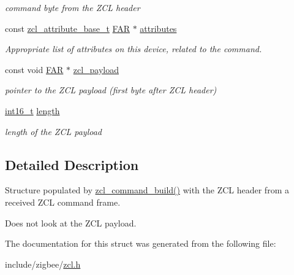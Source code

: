 \begin{DoxyCompactItemize}
\begin{DoxyCompactList}\small\item\em command byte from the Z\-C\-L header \end{DoxyCompactList}\item 
const \hyperlink{structzcl__attribute__base__t}{zcl\-\_\-attribute\-\_\-base\-\_\-t} \hyperlink{group__hal_gaef060b3456fdcc093a7210a762d5f2ed}{F\-A\-R} $\ast$ \hyperlink{group__zcl_ga04c31df34f50e8dd1efaf1105631b2bc}{attributes}
\begin{DoxyCompactList}\small\item\em Appropriate list of attributes on this device, related to the command. \end{DoxyCompactList}\item 
\hypertarget{group__zcl_gaf0e34793a3febabcdb61c020aecbf805}{const void \hyperlink{group__hal_gaef060b3456fdcc093a7210a762d5f2ed}{F\-A\-R} $\ast$ \hyperlink{group__zcl_gaf0e34793a3febabcdb61c020aecbf805}{zcl\-\_\-payload}}\label{group__zcl_gaf0e34793a3febabcdb61c020aecbf805}

\begin{DoxyCompactList}\small\item\em pointer to the Z\-C\-L payload (first byte after Z\-C\-L header) \end{DoxyCompactList}\item 
\hypertarget{group__zcl_ga0ff9f63e333676ba1359f505d02dd281}{\hyperlink{group__hal_ga2140805d08462d474b82ddc8d1c2f3e6}{int16\-\_\-t} \hyperlink{group__zcl_ga0ff9f63e333676ba1359f505d02dd281}{length}}\label{group__zcl_ga0ff9f63e333676ba1359f505d02dd281}

\begin{DoxyCompactList}\small\item\em length of the Z\-C\-L payload \end{DoxyCompactList}\end{DoxyCompactItemize}


\subsection{Detailed Description}
Structure populated by \hyperlink{group__zcl_gadeb35ab493fffec9ba1c33f658929136}{zcl\-\_\-command\-\_\-build()} with the Z\-C\-L header from a received Z\-C\-L command frame. 

Does not look at the Z\-C\-L payload. 

The documentation for this struct was generated from the following file\-:\begin{DoxyCompactItemize}
\item 
include/zigbee/\hyperlink{zcl_8h}{zcl.\-h}\end{DoxyCompactItemize}
